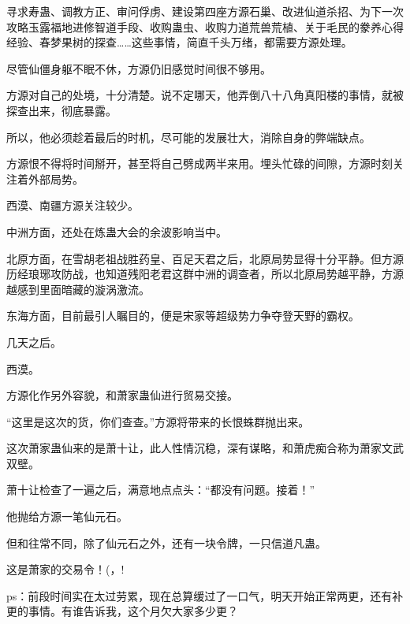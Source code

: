 \begin{this_body}
寻求寿蛊、调教方正、审问俘虏、建设第四座方源石巢、改进仙道杀招、为下一次攻略玉露福地进修智道手段、收购蛊虫、收购力道荒兽荒植、关于毛民的豢养心得经验、春梦果树的探查……这些事情，简直千头万绪，都需要方源处理。

尽管仙僵身躯不眠不休，方源仍旧感觉时间很不够用。

方源对自己的处境，十分清楚。说不定哪天，他弄倒八十八角真阳楼的事情，就被探查出来，彻底暴露。

所以，他必须趁着最后的时机，尽可能的发展壮大，消除自身的弊端缺点。

方源恨不得将时间掰开，甚至将自己劈成两半来用。埋头忙碌的间隙，方源时刻关注着外部局势。

西漠、南疆方源关注较少。

中洲方面，还处在炼蛊大会的余波影响当中。

北原方面，在雪胡老祖战胜药皇、百足天君之后，北原局势显得十分平静。但方源历经琅琊攻防战，也知道残阳老君这群中洲的调查者，所以北原局势越平静，方源越感到里面暗藏的漩涡激流。

东海方面，目前最引人瞩目的，便是宋家等超级势力争夺登天野的霸权。

几天之后。

西漠。

方源化作另外容貌，和萧家蛊仙进行贸易交接。

“这里是这次的货，你们查查。”方源将带来的长恨蛛群抛出来。

这次萧家蛊仙来的是萧十让，此人性情沉稳，深有谋略，和萧虎痴合称为萧家文武双壁。

萧十让检查了一遍之后，满意地点点头：“都没有问题。接着！”

他抛给方源一笔仙元石。

但和往常不同，除了仙元石之外，还有一块令牌，一只信道凡蛊。

这是萧家的交易令！(，!

ps：前段时间实在太过劳累，现在总算缓过了一口气，明天开始正常两更，还有补更的事情。有谁告诉我，这个月欠大家多少更？

\end{this_body}

